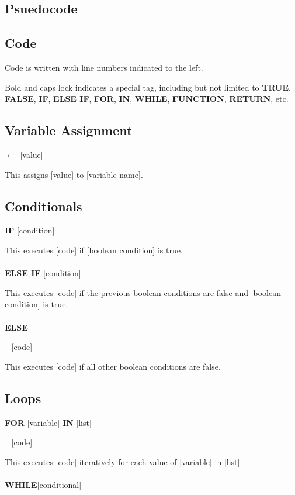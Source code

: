 \documentclass[10pt]{article}
\renewcommand{\bf}[1]{\textbf{#1}}
\newcommand{\header}[1]
{
\section*{#1}
}
\begin{document}
\begin{multicols}{3}
\header{Psuedocode}
\subsection*{Code}
\noindent Code is written with line numbers indicated to the left.

\noindent Bold and caps lock indicates a special tag, including but not limited to \bf{TRUE}, \bf{FALSE}, \bf{IF}, \bf{ELSE IF}, \bf{FOR}, \bf{IN}, \bf{WHILE}, \bf{FUNCTION}, \bf{RETURN}, etc.

\subsection*{Variable Assignment}
 $\leftarrow$ [value]

\noindent This assigns [value] to [variable name].

\subsection*{Conditionals}
\noindent \bf{IF} [condition]

\noindent \qquad [code]

\noindent This executes [code] if [boolean condition] is true. \\
\\
\noindent \bf{ELSE IF} [condition]

\noindent \qquad[code]

\noindent This executes [code] if the previous boolean conditions are false and [boolean condition] is true.\\
\\
\noindent \bf{ELSE}

\noindent \,\,\, [code]

\noindent This executes [code] if all other boolean conditions are false.

\subsection*{Loops}

\bf{FOR} [variable] \bf{IN} [list]

\noindent \,\,\, [code]

\noindent This executes [code] iteratively for each value of [variable] in [list].\\
\\

\bf{WHILE}[conditional]


\end{multicols}
\end{document}
